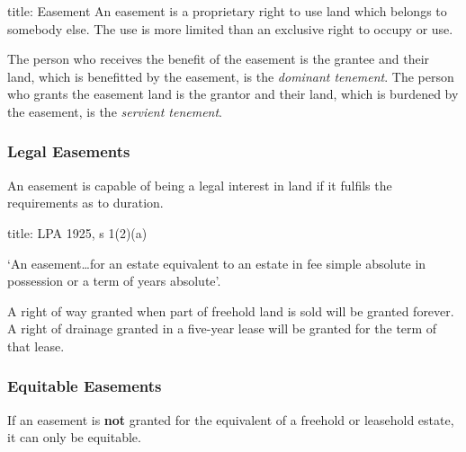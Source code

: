 \documentclass[
]{article}
\newenvironment{Shaded}{}{}
\newcommand{\NormalTok}[1]{#1}
\begin{document}
\begin{Shaded}
\begin{Highlighting}[]
\NormalTok{title: Easement}
\NormalTok{An easement is a proprietary right to use land which belongs to somebody else. The use is more limited than an exclusive right to occupy or use.}
\end{Highlighting}
\end{Shaded}

The person who receives the benefit of the easement is the grantee and
their land, which is benefitted by the easement, is the \emph{dominant
tenement}. The person who grants the easement land is the grantor and
their land, which is burdened by the easement, is the \emph{servient
tenement}.

\hypertarget{legal-easements}{%
\subsubsection{Legal Easements}\label{legal-easements}}

An easement is capable of being a legal interest in land if it fulfils
the requirements as to duration.

\begin{Shaded}
\begin{Highlighting}[]
\NormalTok{title: LPA 1925, s 1(2)(a)}

\NormalTok{‘An easement…for an estate equivalent to an estate in fee simple absolute in possession or a term of years absolute’.}
\end{Highlighting}
\end{Shaded}

\begin{Shaded}
\begin{Highlighting}[]
\NormalTok{A right of way granted when part of freehold land is sold will be granted forever. A right of drainage granted in a five{-}year lease will be granted for the term of that lease.}
\end{Highlighting}
\end{Shaded}

\hypertarget{equitable-easements}{%
\subsubsection{Equitable Easements}\label{equitable-easements}}

If an easement is \textbf{not} granted for the equivalent of a freehold
or leasehold estate, it can only be equitable.
\end{document}
